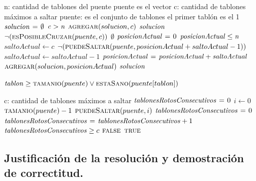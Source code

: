 \begin{codebox}
\li \Comment n: cantidad de tablones del puente puente es el vector
\li \Comment c: cantidad de tablones máximos a saltar
\li \Comment puente: es el conjunto de tablones
\li \Comment el primer tablón es el 1
\li $\id{solucion} \gets \emptyset$
\li \If $\id{c} > \id{n}$
\li     \Then
            $\textnormal{\scshape agregar}(solucion, c)$
\li         \Return $\id{solucion}$
        \End
\li \If $\neg(\textnormal{\scshape esPosibleCruzar}(puente, c))$
\li     \Then
            \Return $\emptyset$
        \End
\li $\id{posicionActual} \gets 0$
\li \While $\id{posicionActual} \leq \id{n}$
\li     \Do
            $saltoActual \gets c$
\li         \While $\neg(\textnormal{\scshape puedeSaltar}(puente, posicionActual + saltoActual - 1))$
\li         \Do
                $saltoActual \gets saltoActual - 1$
            \End
\li     $\id{posicionActual} \gets \id{posicionActual} + \id{saltoActual}$
\li     $\textnormal{\scshape agregar}(solucion, posicionActual)$
        \End
\li \Return $\id{solucion}$
\end{codebox}


\vspace*{0.5cm}


\begin{codebox}
    \Return $\id{tablon} \geq \proc{tamanio}(puente) \lor \proc{estaSano}(puente[tablon])$
\end{codebox}


\vspace*{0.5cm}


\begin{codebox}
\li \Comment c: cantidad de tablones máximos a saltar
\li $\id{tablonesRotosConsecutivos} \gets 0$
\li \For $i \gets 0$ \To $\textnormal{\scshape tamanio}(puente) - 1$
\li     \Do
            \If $\textnormal{\scshape puedeSaltar}(puente, i)$
\li             \Then
                    $\id{tablonesRotosConsecutivos} \gets 0$
\li         \Else
\li             $\id{tablonesRotosConsecutivos} \gets \id{tablonesRotosConsecutivos} + 1$
            \End
\li         \If $\id{tablonesRotosConsecutivos} \geq c$
\li             \Then
                    \Return $\textnormal{\scshape false}$
            \End
        \End
\li \Return $\textnormal{\scshape true}$
\end{codebox}


\newpage
\subsection{Justificación de la resolución y demostración de correctitud.}


